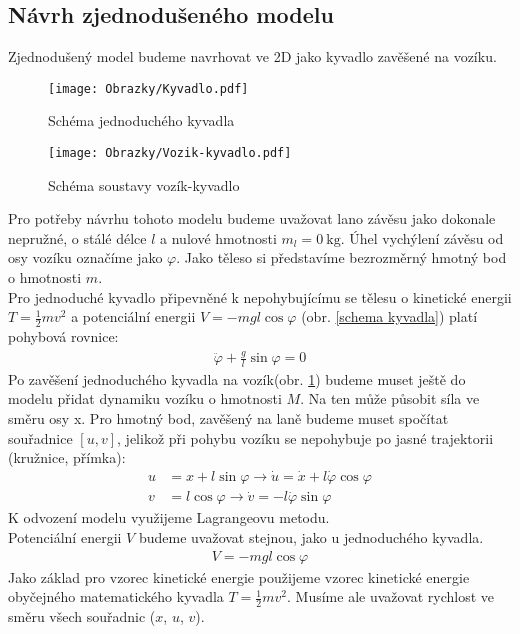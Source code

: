 \documentclass[a4paper, 12pt]{article}
\begin{document}
		\subsection{Návrh zjednodušeného modelu}		
			Zjednodušený model budeme navrhovat ve 2D jako kyvadlo zavěšené na vozíku.
			\begin{wrapfigure}{r}{0pt}
				\texttt{[image: Obrazky/Kyvadlo.pdf]}
				\caption{Schéma jednoduchého kyvadla}
				\label{schema kyvadla}
				\texttt{[image: Obrazky/Vozik-kyvadlo.pdf]}
				\caption{Schéma soustavy vozík-kyvadlo}
				\label{schema vozik-kyvadlo}
			\end{wrapfigure}
			Pro potřeby návrhu tohoto modelu budeme uvažovat lano závěsu jako dokonale nepružné, o stálé délce $l$ a nulové hmotnosti $m_l = \SI{0}{\kilogram}$. Úhel vychýlení závěsu od osy vozíku označíme jako $\varphi$. Jako těleso si představíme bezrozměrný hmotný bod o hmotnosti $m$.\\
			Pro jednoduché kyvadlo připevněné k nepohybujícímu se tělesu o kinetické energii $T = \frac{1}{2}mv^2$ a potenciální energii $V = -mgl\cos\varphi$ (obr. \ref{schema kyvadla}) platí pohybová rovnice:
			\begin{align*}
				\ddot{\varphi}+\frac{g}{l}\sin\varphi=0
			\end{align*}
			Po zavěšení jednoduchého kyvadla na vozík(obr. \ref{schema vozik-kyvadlo}) budeme muset ještě do modelu přidat dynamiku vozíku o hmotnosti $M$. Na ten může působit síla ve směru osy x. Pro hmotný bod, zavěšený na laně budeme muset spočítat souřadnice $\left[u, v\right]$, jelikož při pohybu vozíku se nepohybuje po jasné trajektorii (kružnice, přímka):
			\begin{align*}
				u &= x + l\sin\varphi \rightarrow \dot{u} = \dot{x}+l\dot{\varphi}\cos\varphi\\
				v &= l\cos\varphi \rightarrow \dot{v} = -l\dot{\varphi}\sin\varphi
			\end{align*} 
			K odvození modelu využijeme Lagrangeovu metodu.\\
			Potenciální energii $V$ budeme uvažovat stejnou, jako u jednoduchého kyvadla.
			\begin{align*}
				V = -mgl\cos{\varphi}
			\end{align*}
			Jako základ pro vzorec kinetické energie použijeme vzorec kinetické energie obyčejného matematického kyvadla $T = \frac{1}{2}mv^2$. Musíme ale uvažovat rychlost ve směru všech souřadnic ($x$, $u$, $v$).
\end{document}
